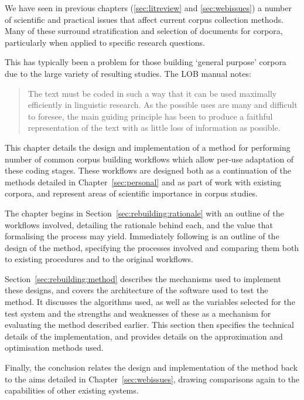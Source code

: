 

We have seen in previous chapters (\ref{sec:litreview} and \ref{sec:webissues}) a number of scientific and practical issues that affect current corpus collection methods.  Many of these surround stratification and selection of documents for corpora, particularly when applied to specific research questions.

This has typically been a problem for those building `general purpose' corpora due to the large variety of resulting studies.  The LOB manual\cite{johansson1986tagged} notes:

\begin{quote}
    The text must be coded in such a way that it can be used maximally efficiently in linguistic research. As the possible uses are many and difficult to foresee, the main guiding principle has been to produce a faithful representation of the text with as little loss of information as possible.
\end{quote}


This chapter details the design and implementation of a method for performing number of common corpus building workflows which allow per-use adaptation of these coding stages.  These workflows are designed both as a continuation of the methods detailed in Chapter~\ref{sec:personal} and as part of work with existing corpora, and represent areas of scientific importance in corpus studies.

The chapter begins in Section~\ref{sec:rebuilding:rationale} with an outline of the workflows involved, detailing the rationale behind each, and the value that formalising the process may yield.  Immediately following is an outline of the design of the method, specifying the processes involved and comparing them both to existing procedures and to the original workflows.

Section~\ref{sec:rebuilding:method} describes the mechanisms used to implement these designs, and covers the architecture of the software used to test the method.  It discusses the algorithms used, as well as the variables selected for the test system and the strengths and weaknesses of these as a mechanism for evaluating the method described earlier.  This section then specifies the technical details of the implementation, and provides details on the approximation and optimisation methods used.  

Finally, the conclusion relates the design and implementation of the method back to the aims detailed in Chapter~\ref{sec:webissues}, drawing comparisons again to the capabilities of other existing systems. 
